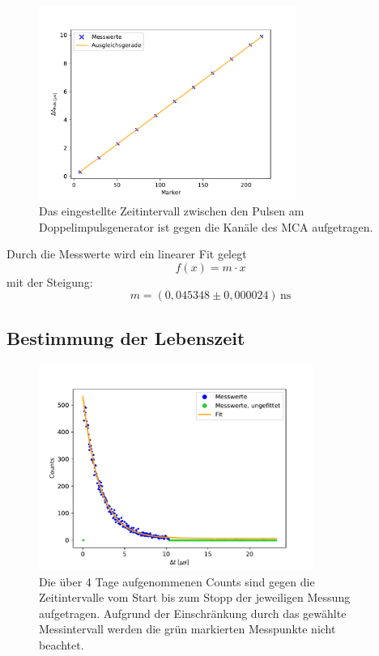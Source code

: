         \begin{figure}[h]
            \centering
            \includegraphics[width = 0.75\textwidth]{plots/Marker_Faktor.pdf}
            \caption{Das eingestellte Zeitintervall zwischen den Pulsen am Doppelimpulsgenerator ist gegen die Kanäle des MCA aufgetragen.}
            \label{fig:Marker_Faktor}
        \end{figure}

        \FloatBarrier

        Durch die Messwerte wird ein linearer Fit gelegt
        \begin{equation*}
            f(x) = m \cdot x
        \end{equation*}
        mit der Steigung:
        \begin{equation*}
            m = (0,045348 \pm 0,000024) \, \text{ns}
        \end{equation*}

    \subsection{Bestimmung der Lebenszeit}
        \begin{figure}[h]
            \centering
            \includegraphics[width = 0.8\textwidth]{plots/Lebenszeit.pdf}
            \caption{Die über 4 Tage aufgenommenen Counts sind gegen die Zeitintervalle vom Start bis zum Stopp der jeweiligen Messung aufgetragen. Aufgrund der Einschränkung durch das gewählte Messintervall werden die grün markierten Messpunkte nicht beachtet.}
            \label{fig:Lebenszeit}
        \end{figure}

